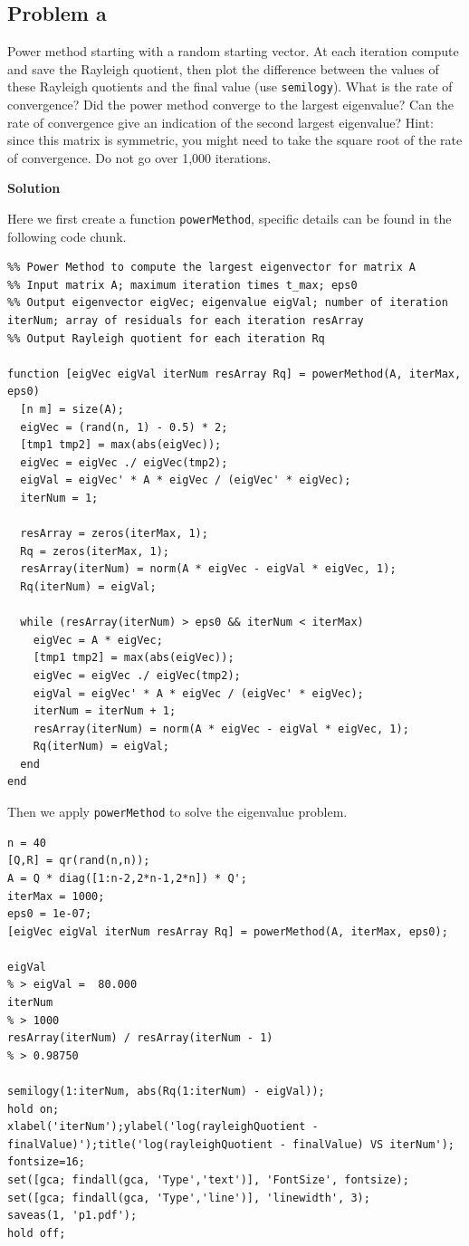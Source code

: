 \documentclass[12pt,oneside,a4paper]{article}
\newcommand{\subproblem}[1]
{
    \subsection*{Problem {#1}}
}
\newcommand{\solution}
{
    \vspace{15pt}
    \noindent\ignorespaces\textbf{\large Solution}\par
}
\newcommand{\m}[1]{\texttt{{#1}}}
\begin{document}
\subproblem{a}
Power method starting with a random starting vector. At each iteration compute and save the Rayleigh quotient, then plot the difference between the values of these Rayleigh quotients and the final value (use \m{semilogy}). What is the rate of convergence? Did the power method converge to the largest eigenvalue? Can the rate of convergence give an indication of the second largest eigenvalue? Hint: since this matrix is symmetric, you might need to take the square root of the rate of convergence. Do not go over 1,000 iterations.

\solution
Here we first create a function \m{powerMethod}, specific details can be found in the following code chunk. 
\begin{lstlisting}
%% Power Method to compute the largest eigenvector for matrix A
%% Input matrix A; maximum iteration times t_max; eps0 
%% Output eigenvector eigVec; eigenvalue eigVal; number of iteration iterNum; array of residuals for each iteration resArray
%% Output Rayleigh quotient for each iteration Rq  

function [eigVec eigVal iterNum resArray Rq] = powerMethod(A, iterMax, eps0)
  [n m] = size(A);
  eigVec = (rand(n, 1) - 0.5) * 2;
  [tmp1 tmp2] = max(abs(eigVec));
  eigVec = eigVec ./ eigVec(tmp2);
  eigVal = eigVec' * A * eigVec / (eigVec' * eigVec);
  iterNum = 1;

  resArray = zeros(iterMax, 1);
  Rq = zeros(iterMax, 1);
  resArray(iterNum) = norm(A * eigVec - eigVal * eigVec, 1);
  Rq(iterNum) = eigVal;

  while (resArray(iterNum) > eps0 && iterNum < iterMax)
    eigVec = A * eigVec;
    [tmp1 tmp2] = max(abs(eigVec));
    eigVec = eigVec ./ eigVec(tmp2);
    eigVal = eigVec' * A * eigVec / (eigVec' * eigVec);
    iterNum = iterNum + 1;
    resArray(iterNum) = norm(A * eigVec - eigVal * eigVec, 1);
    Rq(iterNum) = eigVal;
  end
end
\end{lstlisting}

Then we apply \m{powerMethod} to solve the eigenvalue problem.
\begin{lstlisting}
n = 40
[Q,R] = qr(rand(n,n));
A = Q * diag([1:n-2,2*n-1,2*n]) * Q';
iterMax = 1000;
eps0 = 1e-07;
[eigVec eigVal iterNum resArray Rq] = powerMethod(A, iterMax, eps0);

eigVal
% > eigVal =  80.000
iterNum
% > 1000
resArray(iterNum) / resArray(iterNum - 1)
% > 0.98750

semilogy(1:iterNum, abs(Rq(1:iterNum) - eigVal));
hold on;
xlabel('iterNum');ylabel('log(rayleighQuotient - finalValue)');title('log(rayleighQuotient - finalValue) VS iterNum');
fontsize=16;
set([gca; findall(gca, 'Type','text')], 'FontSize', fontsize);
set([gca; findall(gca, 'Type','line')], 'linewidth', 3);
saveas(1, 'p1.pdf');
hold off;
\end{lstlisting}
\end{document}
